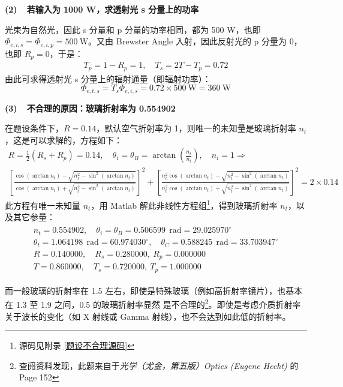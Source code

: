 \documentclass[UTF8]{report}
\theoremstyle{MyLineTheoremStyle} %
\theoremstyle{MyBlockTheoremStyle} %
\theoremstyle{MySubsubsectionStyle} %
\begin{document}
\textbf{(2)\ \ 若输入为 1000 W，求透射光 s 分量上的功率}

光束为自然光，因此 s 分量和 p 分量的功率相同，都为 500 W，也即 $\Phi_{e,i,s} = \Phi_{e,i,p} = 500 \ \mathrm{W}$。又由 Brewster Angle 入射，因此反射光的 p 分量为 0，也即 $R_p = 0$，于是：
\begin{gather}
T_p = 1 - R_p = 1,\quad T_s = 2T - T_p = 0.72 
\end{gather}
由此可求得透射光 s 分量上的辐射通量（即辐射功率）：
\begin{equation}
\Phi_{e,t,s} = T_s \Phi_{e,i,s} = 0.72 \times 500 \ \mathrm{W} =  360 \ \mathrm{W}
\end{equation}

{\color{red} \textbf{(3)\ \ 不合理的原因：玻璃折射率为 0.554902}}

在题设条件下，$R = 0.14$，默认空气折射率为 1，则唯一的未知量是玻璃折射率 $n_t$，这是可以求解的，方程如下：
\begin{gather}\label{题设不合理}
    R = \frac{1}{2}(R_s + R_p) = 0.14,\quad \theta_i = \theta_B = \arctan\left(\frac{n_t}{n_i}\right) ,\quad n_i = 1
    \Longrightarrow \\ 
    \left[ \frac{ \cos (\arctan n_t) - \sqrt{n_{t}^2 - \sin^2 (\arctan n_t)} }{\cos (\arctan n_t) + \sqrt{n_{t}^2 - \sin^2 (\arctan n_t)}} \right]^2 + \left[ \frac{ n_{t}^2\cos (\arctan n_t) - \sqrt{n_{t}^2 - \sin^2 (\arctan n_t)} }{n_{t}^2\cos (\arctan n_t) + \sqrt{n_{t}^2 - \sin^2 (\arctan n_t)}} \right]^2  = 2\times 0.14
\end{gather}
此方程有唯一未知量 $n_t$，用 Matlab 解此非线性方程组\footnote{源码见附录 \ref{题设不合理源码}}，得到玻璃折射率 $n_t$，以及其它参量：
\begin{gather}
\begin{matrix}
    n_t = 0.554902 
    ,\quad 
    \theta_i = \theta_B = 0.506599\ \ \mathrm{rad}  = 29.025970^\circ
    \\
    \theta_t =  1.064198\ \ \mathrm{rad}  = 60.974030^\circ
    ,\quad 
    \theta_C =  0.588245\ \ \mathrm{rad}  = 33.703947^\circ
    \\
    R = 0.140000,\quad   R_s = 0.280000,\    R_p = 0.000000 \\ 
    T = 0.860000,\quad   T_s = 0.720000,\    T_p = 1.000000 
\end{matrix}
\end{gather}

而一般玻璃的折射率在 1.5 左右，即使是特殊玻璃（例如高折射率镜片），也基本在 1.3 至 1.9 之间，0.5 的玻璃折射率显然{\color{red} 是不合理的}\footnote{查阅资料发现，此题来自于\textit{光学（尤金，第五版）Optics (Eugene Hecht)} 的 Page 152}。即使是考虑介质折射率关于波长的变化（如 X 射线或 Gamma 射线），也不会达到如此低的折射率。
\end{document}
